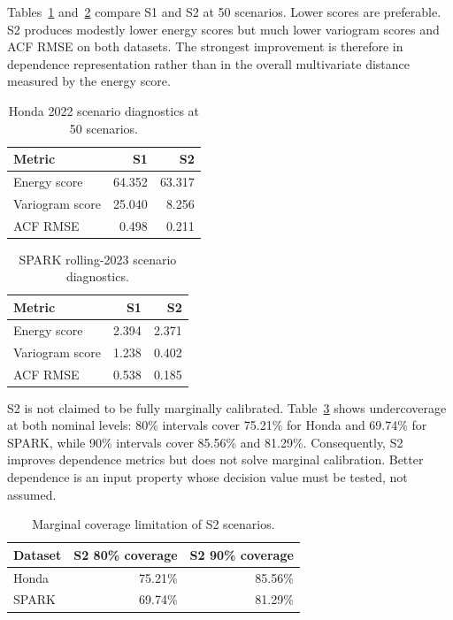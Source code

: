 \documentclass[10pt,twocolumn]{article}
\begin{document}
Tables~\ref{tab:honda-scenarios} and~\ref{tab:spark-scenarios} compare S1 and S2
at 50 scenarios. Lower scores are preferable. S2 produces modestly lower energy
scores but much lower variogram scores and ACF RMSE on both datasets. The
strongest improvement is therefore in dependence representation rather than in
the overall multivariate distance measured by the energy score.

\begin{table}[t]
\centering
\caption{Honda 2022 scenario diagnostics at 50 scenarios.}
\label{tab:honda-scenarios}
\small
\begin{tabular}{lrr}
\toprule
Metric & S1 & S2\\
\midrule
Energy score & 64.352 & 63.317\\
Variogram score & 25.040 & 8.256\\
ACF RMSE & 0.498 & 0.211\\
\bottomrule
\end{tabular}
\end{table}

\begin{table}[t]
\centering
\caption{SPARK rolling-2023 scenario diagnostics.}
\label{tab:spark-scenarios}
\small
\begin{tabular}{lrr}
\toprule
Metric & S1 & S2\\
\midrule
Energy score & 2.394 & 2.371\\
Variogram score & 1.238 & 0.402\\
ACF RMSE & 0.538 & 0.185\\
\bottomrule
\end{tabular}
\end{table}

S2 is not claimed to be fully marginally calibrated. Table~\ref{tab:coverage}
shows undercoverage at both nominal levels: 80\% intervals cover 75.21\% for
Honda and 69.74\% for SPARK, while 90\% intervals cover 85.56\% and 81.29\%.
Consequently, S2 improves dependence metrics but does not solve marginal
calibration. Better dependence is an input property whose decision value must
be tested, not assumed.

\begin{table}[t]
\centering
\caption{Marginal coverage limitation of S2 scenarios.}
\label{tab:coverage}
\small
\begin{tabular}{lrr}
\toprule
Dataset & S2 80\% coverage & S2 90\% coverage\\
\midrule
Honda & 75.21\% & 85.56\%\\
SPARK & 69.74\% & 81.29\%\\
\bottomrule
\end{tabular}
\end{table}
\end{document}

